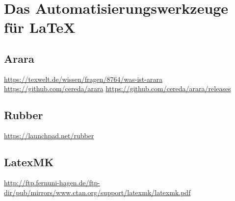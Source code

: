 \chapter{Das Automatisierungswerkzeuge für \LaTeX}

\section{Arara}
\url{https://texwelt.de/wissen/fragen/8764/was-ist-arara}
\url{https://github.com/cereda/arara}
\url{https://github.com/cereda/arara/releases}


\section{Rubber}
\url{https://launchpad.net/rubber}
\section{LatexMK}
\url{http://ftp.fernuni-hagen.de/ftp-dir/pub/mirrors/www.ctan.org/support/latexmk/latexmk.pdf}
